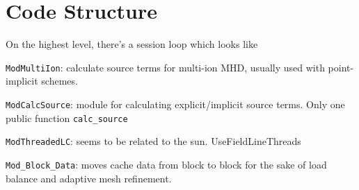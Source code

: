 \documentclass[11pt]{book} %
\begin{document}
\section{Code Structure}

On the highest level, there's a session loop which looks like




\verb|ModMultiIon|: calculate source terms for multi-ion MHD, usually used with point-implicit schemes.

\verb|ModCalcSource|: module for calculating explicit/implicit source terms. Only one public function \verb|calc_source|

\verb|ModThreadedLC|: seems to be related to the sun. UseFieldLineThreads

\verb|Mod_Block_Data|: moves cache data from block to block for the sake of load balance and adaptive mesh refinement.


\end{document}
